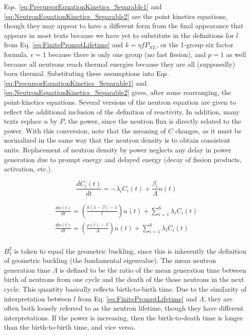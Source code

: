 \documentclass[10pt]{article}
\begin{document}
\begin{flushleft}
Eqs. \ref{eq:PrecursorEquationKinetics_Separable1} and \ref{eq:NeutronEquationKinetics_Separable2} are the point kinetics equations, though they may appear to have a different form from the final appearance that appears in most texts because we have yet to substitute in the definitions for \(l\) from Eq. \ref{eq:FinitePromptLifetime} and \(k=\eta fP_{NL}\), or the 1-group six factor formula. \(\epsilon = 1\) because there is only one group (no fast fission), and \(p=1\) as well because all neutrons reach thermal energies because they are all (supposedly) born thermal. Substituting these assumptions into Eqs. \ref{eq:PrecursorEquationKinetics_Separable1} and \ref{eq:NeutronEquationKinetics_Separable2} gives, after some rearranging, the point-kinetics equations. Several versions of the neutron equation are given to reflect the additional inclusion of the definition of reactivity. In addition, many texts replace \(n\) by \(P\), the power, since the neutron flux is directly related to the power. With this conversion, note that the meaning of \(C\) changes, as it must be normalized in the same way that the neutron density is to obtain consistent units. Replacement of neutron density by power neglects any delay in power generation due to prompt energy and delayed energy (decay of fission products, activation, etc.). 

\begin{equation}
\label{eq:PointKineticsPrecursor3}
\frac{dC_i(t)}{dt}=-\lambda_iC_i(t)+\frac{\beta_i}{\Lambda}n(t)
\end{equation} 

\begin{equation}
\label{eq:PointKineticsNeutrons3}
\begin{aligned}
\frac{dn(t)}{dt}=\left(\frac{k(1-\beta)-1}{l}\right)n(t)+\sum_{i=1}^{6}\lambda_i C_i(t)\\
\frac{dn(t)}{dt}=\left(\frac{\rho(t)-\beta}{\Lambda}\right)n(t)+\sum_{i=1}^{6}\lambda_iC_i(t)\\
\end{aligned}
\end{equation} 

\(B_{1}^{2}\) is taken to equal the geometric buckling, since this is inherently the definition of geometric buckling (the fundamental eigenvalue). The mean neutron generation time \(\Lambda\) is defined to be the ratio of the mean generation time between birth of neutrons from one cycle and the death of the those neutrons in the next cycle. This quantity basically reflects birth-to-birth time. Due to the similarity of interpretation between \(l\) from Eq. \ref{eq:FinitePromptLifetime} and \(\Lambda\), they are often both loosely referred to as the neutron lifetime, though they have different interpretations. If the power is increasing, then the birth-to-death time is longer than the birth-to-birth time, and vice versa. 


\end{flushleft}
\end{document}

